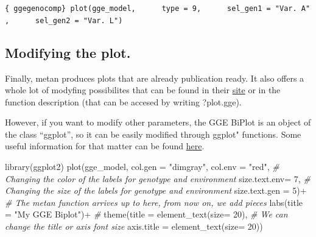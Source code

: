 \documentclass[
]{book}
\newenvironment{Shaded}{\begin{snugshade}}{\end{snugshade}}
\newcommand{\AttributeTok}[1]{\textcolor[rgb]{0.77,0.63,0.00}{#1}}
\newcommand{\CommentTok}[1]{\textcolor[rgb]{0.56,0.35,0.01}{\textit{#1}}}
\newcommand{\DecValTok}[1]{\textcolor[rgb]{0.00,0.00,0.81}{#1}}
\newcommand{\FunctionTok}[1]{\textcolor[rgb]{0.00,0.00,0.00}{#1}}
\newcommand{\NormalTok}[1]{#1}
\newcommand{\SpecialCharTok}[1]{\textcolor[rgb]{0.00,0.00,0.00}{#1}}
\newcommand{\StringTok}[1]{\textcolor[rgb]{0.31,0.60,0.02}{#1}}
\begin{document}
\texttt{\{\ ggegenocomp\}\ plot(gge\_model,\ \ \ \ \ \ type\ =\ 9,\ \ \ \ \ \ sel\_gen1\ =\ "Var.\ A",\ \ \ \ \ \ sel\_gen2\ =\ "Var.\ L")}

\hypertarget{modifying-the-plot.}{%
\subsection{Modifying the plot.}\label{modifying-the-plot.}}

Finally, metan produces plots that are already publication ready. It also offers a whole lot of modyfing possibilites that can be found in their \href{https://tiagoolivoto.github.io/metan/articles/vignettes_gge.html}{site} or in the function description (that can be accesed by writing ?plot.gge).

However, if you want to modify other parameters, the GGE BiPlot is an object of the class ``ggplot'', so it can be easily modified through ggplot" functions. Some useful information for that matter can be found \href{http://r-statistics.co/Complete-Ggplot2-Tutorial-Part2-Customizing-Theme-With-R-Code.html}{here}.

\begin{Shaded}
\begin{Highlighting}[]
\FunctionTok{library}\NormalTok{(ggplot2)}
\FunctionTok{plot}\NormalTok{(gge\_model,}
     \AttributeTok{col.gen =} \StringTok{"dimgray"}\NormalTok{,  }
     \AttributeTok{col.env =} \StringTok{"red"}\NormalTok{,                            }\CommentTok{\# Changing the color of the labels for genotype and environment  }
     \AttributeTok{size.text.env=} \DecValTok{7}\NormalTok{,                           }\CommentTok{\# Changing the size of the labels for genotype and environment}
     \AttributeTok{size.text.gen =} \DecValTok{5}\NormalTok{)}\SpecialCharTok{+}                         \CommentTok{\# The metan function arrives up to here, from now on, we add pieces}
     \FunctionTok{labs}\NormalTok{(}\AttributeTok{title =} \StringTok{"My GGE Biplot"}\NormalTok{)}\SpecialCharTok{+}              \CommentTok{\# }
  \FunctionTok{theme}\NormalTok{(}\AttributeTok{title =} \FunctionTok{element\_text}\NormalTok{(}\AttributeTok{size=} \DecValTok{20}\NormalTok{),          }\CommentTok{\# We can change the title or axis font size}
        \AttributeTok{axis.title =} \FunctionTok{element\_text}\NormalTok{(}\AttributeTok{size=} \DecValTok{20}\NormalTok{)) }
\end{Highlighting}
\end{Shaded}
\end{document}
